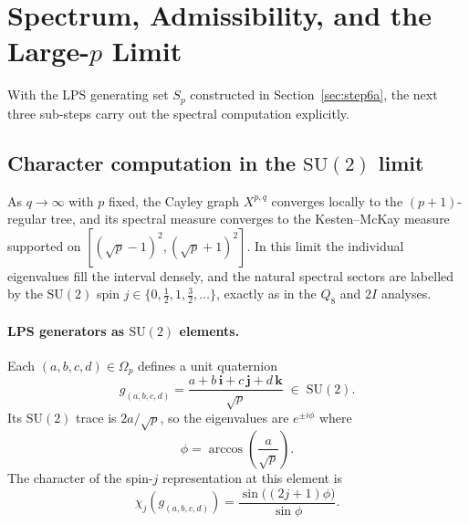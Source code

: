 \documentclass[11pt,a4paper]{article}
\begin{document}
\section{Spectrum, Admissibility, and the Large-$p$ Limit}
  \label{sec:step6bcd}

  With the LPS generating set $S_p$ constructed in Section~\ref{sec:step6a},
  the next three sub-steps carry out the spectral computation explicitly.

  \subsection{Character computation in the $\mathrm{SU}(2)$ limit}
    \label{sec:step6b}

    As $q \to \infty$ with $p$ fixed, the Cayley graph $X^{p,q}$ converges
    locally to the $(p+1)$-regular tree, and its spectral measure converges
    to the Kesten--McKay measure supported on $[(\sqrt{p}-1)^2,(\sqrt{p}+1)^2]$.
    In this limit the individual eigenvalues fill the interval densely, and
    the natural spectral sectors are labelled by the $\mathrm{SU}(2)$ spin
    $j \in \{0, \tfrac{1}{2}, 1, \tfrac{3}{2}, \ldots\}$, exactly as in the
    $Q_8$ and $2I$ analyses.

    \paragraph{LPS generators as $\mathrm{SU}(2)$ elements.}
      Each $(a,b,c,d) \in \Omega_p$ defines a unit quaternion
    \begin{equation}
      g_{(a,b,c,d)} = \frac{a + b\,\mathbf{i} + c\,\mathbf{j} + d\,\mathbf{k}}{\sqrt{p}}
      \;\in\; \mathrm{SU}(2).
      \label{eq:lps-su2-element}
      \end{equation}
      Its $\mathrm{SU}(2)$ trace is $2a/\sqrt{p}$, so the eigenvalues are
      $e^{\pm i\phi}$ where
    \begin{equation}
      \phi = \arccos\!\left(\frac{a}{\sqrt{p}}\right).
      \label{eq:lps-angle}
      \end{equation}
      The character of the spin-$j$ representation at this element is
    \begin{equation}
      \chi_j\!\left(g_{(a,b,c,d)}\right)
      = \frac{\sin\!\bigl((2j+1)\phi\bigr)}{\sin\phi}.
      \label{eq:lps-chi}
      \end{equation}
\end{document}
